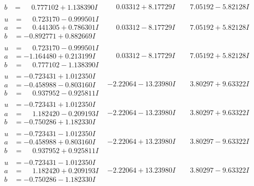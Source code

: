 \documentclass[1p]{elsarticle_modified}
\theoremstyle{definition}
\begin{document}
$$\begin{array}{c|c|c}
\begin{aligned}
b &= \phantom{-}0.777102 + 1.138390 I\end{aligned}
 & \phantom{-}0.03312 + 8.17729 I & \phantom{-}7.05192 - 5.82128 I \\ \hline\begin{aligned}
u &= \phantom{-}0.723170 - 0.999501 I \\
a &= \phantom{-}0.441305 + 0.786301 I \\
b &= -0.892771 + 0.882669 I\end{aligned}
 & \phantom{-}0.03312 - 8.17729 I & \phantom{-}7.05192 + 5.82128 I \\ \hline\begin{aligned}
u &= \phantom{-}0.723170 - 0.999501 I \\
a &= -1.164480 + 0.213199 I \\
b &= \phantom{-}0.777102 - 1.138390 I\end{aligned}
 & \phantom{-}0.03312 - 8.17729 I & \phantom{-}7.05192 + 5.82128 I \\ \hline\begin{aligned}
u &= -0.723431 + 1.012350 I \\
a &= -0.458988 - 0.803160 I \\
b &= \phantom{-}0.937952 - 0.925811 I\end{aligned}
 & -2.22064 - 13.23980 I & \phantom{-}3.80297 + 9.63322 I \\ \hline\begin{aligned}
u &= -0.723431 + 1.012350 I \\
a &= \phantom{-}1.182420 - 0.209193 I \\
b &= -0.750286 + 1.182330 I\end{aligned}
 & -2.22064 - 13.23980 I & \phantom{-}3.80297 + 9.63322 I \\ \hline\begin{aligned}
u &= -0.723431 - 1.012350 I \\
a &= -0.458988 + 0.803160 I \\
b &= \phantom{-}0.937952 + 0.925811 I\end{aligned}
 & -2.22064 + 13.23980 I & \phantom{-}3.80297 - 9.63322 I \\ \hline\begin{aligned}
u &= -0.723431 - 1.012350 I \\
a &= \phantom{-}1.182420 + 0.209193 I \\
b &= -0.750286 - 1.182330 I\end{aligned}
 & -2.22064 + 13.23980 I & \phantom{-}3.80297 - 9.63322 I \\ \hline\begin{aligned}

\end{aligned}
\end{array}$$
\end{document}
